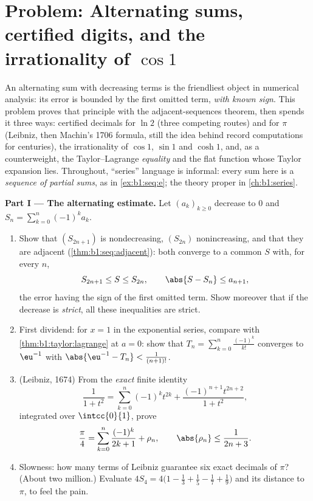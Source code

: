 \section{Problem: Alternating sums, certified digits, and the
irrationality of $\cos 1$}

\begin{problem}
\label{pb:b1:taylor:1}
An alternating sum with decreasing terms is the friendliest
object in numerical analysis: its error is bounded by the first
omitted term, \emph{with known sign}. This problem proves that
principle with the adjacent-sequences theorem, then spends it
three ways: certified decimals for $\ln 2$ (three competing
routes) and for $\pi$ (Leibniz, then Machin's 1706 formula, still
the idea behind record computations for centuries), the
irrationality of $\cos 1$, $\sin 1$ and $\cosh 1$, and, as a
counterweight, the Taylor--Lagrange \emph{equality} and the flat
function whose Taylor expansion lies. Throughout, ``series'' language is informal: every sum
here is a \emph{sequence of partial sums}, as in
\cref{ex:b1:seq:e}; the theory proper  in
\cref{ch:b1:series}.

\medskip
\noindent\textbf{Part I --- The alternating estimate.} Let
$(a_k)_{k \geq 0}$ decrease to $0$ and $S_n = \sum_{k=0}^{n}
(-1)^k a_k$.
\begin{enumerate}
  \item Show that $(S_{2n+1})$ is nondecreasing, $(S_{2n})$
        nonincreasing, and that they are adjacent
        (\cref{thm:b1:seq:adjacent}): both converge to a common
        $S$ with, for every $n$,
        \[
        S_{2n+1} \leq S \leq S_{2n},
        \qquad
        \abs{S - S_n} \leq a_{n+1} ,
        \]
        the error having the sign of the first omitted term.
        Show moreover that if the decrease is \emph{strict}, all
        these inequalities are strict.
  \item First dividend: for $x = 1$ in the exponential series,
        compare with \cref{thm:b1:taylor:lagrange} at $a = 0$:
        show that $T_n = \sum_{k=0}^{n} \frac{(-1)^k}{k!}$
        converges to $\eu^{-1}$ with $\abs{\eu^{-1} - T_n} <
        \frac{1}{(n+1)!}$.
  \item (Leibniz, 1674) From the \emph{exact} finite identity
        \[
        \frac{1}{1 + t^2} = \sum_{k=0}^{n} (-1)^k t^{2k}
        + \frac{(-1)^{n+1} t^{2n+2}}{1 + t^2} ,
        \]
        integrated over $\intcc{0}{1}$, prove
        \[
        \frac\pi4 = \sum_{k=0}^{n} \frac{(-1)^k}{2k+1} + \rho_n,
        \qquad \abs{\rho_n} \leq \frac{1}{2n+3} .
        \]
  \item Slowness: how many terms of Leibniz guarantee six exact
        decimals of $\pi$? (About two million.) Evaluate $4 S_4
        = 4\bigl(1 - \frac13 + \frac15 - \frac17 +
        \frac19\bigr)$ and its distance to $\pi$, to feel the
        pain.
\end{enumerate}


\end{problem}
